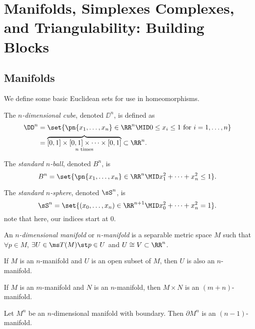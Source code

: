 \chapter[Homological Prereqs]{Manifolds, Simplexes Complexes, and Triangulability: Building Blocks}

\section{Manifolds}
We define some basic Euclidean sets for use in homeomorphisms.
\begin{definition}[$n$-cube]
  The \emph{$n$-dimensional cube}, denoted $\DD^n$, is defined as
  \begin{align*}
    \DD^n
    &= \set{\pn{x_1, \ldots, x_n} \in \RR^n \MID 0 \leq x_i \leq 1 \text{ for } i = 1, \ldots, n} \\
    &= \overbrace{[0,1] \times [0,1] \times \cdots \times [0,1]}_{n \text{ times}} \subset \RR^n.
  \end{align*}
\end{definition}
\begin{definition}[$n$-ball]
  The \emph{standard $n$-ball}, denoted $B^n$, is
  \[
    B^n = \set{\pn{x_1, \ldots, x_n} \in \RR^n \MID x_1^2 + \cdots + x^2_n \leq
      1}.
  \]
\end{definition}
\begin{definition}[$n$-sphere]
  The \emph{standard $n$-sphere}, denoted $\sS^n$, is
  \[
    \sS^n = \set{(x_0, \ldots, x_n) \in \RR^{n+1} \MID x^2_0 + \cdots + x^2_n =
      1}.
  \]
  note that here, our indices start at $0$.
\end{definition}
\begin{definition}[$n$-manifold]
  An \emph{$n$-dimensional manifold} or \emph{$n$-manifold} is a separable
  metric space $M$ such that $\forall p \in M$, $\exists U \in \ms T(M) \st p
  \in U$ and $U \cong V \subset \RR^n$.
\end{definition}
\begin{problem}[15.8]
  If $M$ is an $n$-manifold and $U$ is an open subset of $M$, then $U$ is also
  an $n$-manifold.
\end{problem}
\begin{problem}[15.9]
  If $M$ is an $m$-manifold and $N$ is an $n$-manifold, then $M \times N$ is an
  $(m+n)$-manifold.
\end{problem}
\begin{problem}[15.10]
  Let $M^n$ be an $n$-dimensional manifold with boundary. Then $\partial M^n$ is
  an $(n-1)$-manifold.
\end{problem}
